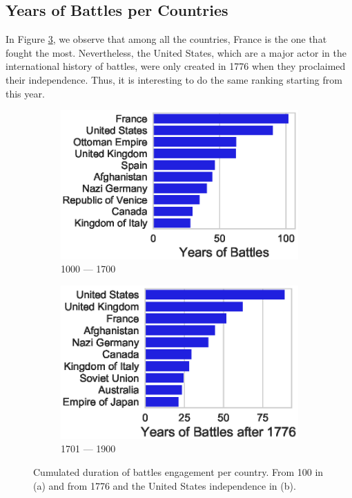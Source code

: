 \subsection{Years of Battles per Countries}
In Figure \ref{fig:FightingDurationRanking}, we observe that among all the countries, France is the one that fought the most. Nevertheless, the United States, which are a major actor in the international history of battles, were only created in 1776 when they proclaimed their independence. Thus, it is interesting to do the same ranking starting from this year. 
 \begin{figure}[h]
 	\centering
 	\begin{subfigure}[b]{0.475\linewidth}
 		\centering
 		\includegraphics[width=\linewidth]{figures/YearsFightingRanking.eps}
 		\caption[]%
 		{{\small 1000 --- 1700}}    
 		\label{fig:FightingDurationRankingOld}
 	\end{subfigure}
 	\begin{subfigure}[b]{0.475\linewidth}  
 		\centering 
 		\includegraphics[width=\linewidth]{figures/YearsFightingRankingModern}
 		\caption[]%
 		{{\small 1701 --- 1900}}    
 		\label{fig:FightingDurationRankingModern}
 	\end{subfigure}
 	\baselineskip
	\caption{Cumulated duration of battles engagement per country. From 100 in (a) and from 1776 and the United States independence in (b).} 
 	\label{fig:FightingDurationRanking}
 \end{figure}
 
